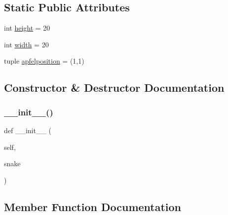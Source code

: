 \subsection*{Static Public Attributes}
\begin{DoxyCompactItemize}
\item 
int \mbox{\hyperlink{class_projekt_01_snake_01auf_01_python_1_1_welt_ad12fc34ce789bce6c8a05d8a17138534}{height}} = 20
\item 
int \mbox{\hyperlink{class_projekt_01_snake_01auf_01_python_1_1_welt_a2474a5474cbff19523a51eb1de01cda4}{width}} = 20
\item 
tuple \mbox{\hyperlink{class_projekt_01_snake_01auf_01_python_1_1_welt_a9ac065a66ee56ec5e480a0efbd92ba53}{apfelposition}} = (1,1)
\end{DoxyCompactItemize}


\subsection{Constructor \& Destructor Documentation}
\mbox{\label{class_projekt_01_snake_01auf_01_python_1_1_welt_a2d656a42de20fa4f426f6eb48bdeaab4}} 
\subsubsection{\texorpdfstring{\+\_\+\+\_\+init\+\_\+\+\_\+()}{\_\_init\_\_()}}
{\footnotesize\ttfamily def \+\_\+\+\_\+init\+\_\+\+\_\+ (\begin{DoxyParamCaption}\item[{}]{self,  }\item[{}]{snake }\end{DoxyParamCaption})}



\subsection{Member Function Documentation}
\mbox{\label{class_projekt_01_snake_01auf_01_python_1_1_welt_aa2d78aa80b3d5bcb0f186d9f7778a439}} 
